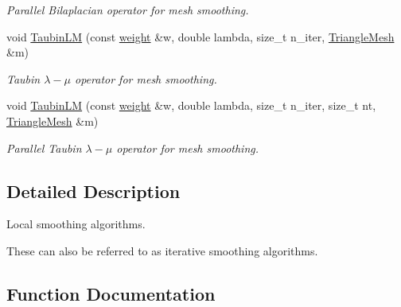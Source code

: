 \begin{DoxyCompactItemize}
\begin{DoxyCompactList}\small\item\em Parallel Bilaplacian operator for mesh smoothing. \end{DoxyCompactList}\item 
void \hyperlink{namespacegeoproc_1_1smoothing_1_1local_ac234b9f2b455e7dbc97b71bb6c9c47d3}{Taubin\+LM} (const \hyperlink{namespacegeoproc_a12e5a10581b53b9dd9a509127527f843}{weight} \&w, double lambda, size\+\_\+t n\+\_\+iter, \hyperlink{classgeoproc_1_1TriangleMesh}{Triangle\+Mesh} \&m)
\begin{DoxyCompactList}\small\item\em Taubin $\lambda-\mu$ operator for mesh smoothing. \end{DoxyCompactList}\item 
void \hyperlink{namespacegeoproc_1_1smoothing_1_1local_a05133ca078331bc4fe3e95104c35d3af}{Taubin\+LM} (const \hyperlink{namespacegeoproc_a12e5a10581b53b9dd9a509127527f843}{weight} \&w, double lambda, size\+\_\+t n\+\_\+iter, size\+\_\+t nt, \hyperlink{classgeoproc_1_1TriangleMesh}{Triangle\+Mesh} \&m)
\begin{DoxyCompactList}\small\item\em Parallel Taubin $\lambda-\mu$ operator for mesh smoothing. \end{DoxyCompactList}\end{DoxyCompactItemize}


\subsection{Detailed Description}
Local smoothing algorithms. 

These can also be referred to as iterative smoothing algorithms. 

\subsection{Function Documentation}
\mbox{\label{namespacegeoproc_1_1smoothing_1_1local_ae414b9bd00610e2f63096ab8c087b5ea}} 
